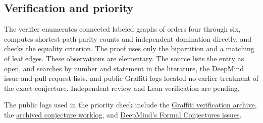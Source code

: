 \documentclass[11pt]{article}
\begin{document}
\subsection{Verification and priority}\label{verification-and-priority}

The verifier enumerates connected labeled graphs of orders four through six, computes shortest-path parity counts and independent domination directly, and checks the equality criterion. The proof uses only the bipartition and a matching of leaf edges. These observations are elementary. The source lists the entry as open, and searches by number and statement in the literature, the DeepMind issue and pull-request lists, and public Graffiti logs located no earlier treatment of the exact conjecture. Independent review and Lean verification are pending.

The public logs used in the priority check include the \href{https://gitlab.com/ai-village-agents/village/graffiti-verification}{Graffiti verification archive}, the \href{https://gist.github.com/siddhantdubey/22f22a7a23db5174ee59e32eaa8724aa}{archived conjecture worklog}, and \href{https://github.com/google-deepmind/formal-conjectures/issues}{DeepMind's Formal Conjectures issues}.
\end{document}
